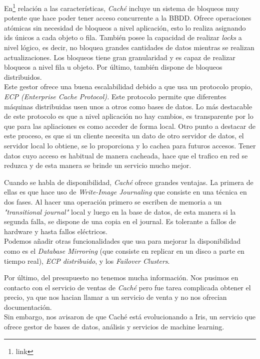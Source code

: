 \documentclass{article}
\begin{document}
En\footnote{link} relación a las características, \emph{Caché} incluye un sistema de bloqueos muy potente que hace poder tener acceso concurrente a la BBDD. Ofrece operaciones atómicas sin necesidad de bloqueos a nivel aplicación, esto lo realiza asignando ids únicos a cada objeto o fila. También posee la capacidad de realizar \emph{locks} a nivel lógico, es decir, no bloquea grandes cantidades de datos mientras se realizan actualizaciones. Los bloqueos tiene gran granularidad y es capaz de realizar bloqueos a nivel fila u objeto. Por último, también dispone de bloqueos distribuidos.\\

Este gestor ofrece una buena escalabilidad debido a que usa un protocolo propio, \emph{ECP (Enterprise Cache Protocol).} Este protocolo permite que diferentes máquinas distribuidas usen unos a otros como bases de datos. Lo más destacable de este protocolo es que a nivel aplicación no hay cambios, es transparente por lo que para las apliaciones es como acceder de forma local. Otro punto a destacar de este proceso, es que si un cliente necesita un dato de otro servidor de datos, el servidor local lo obtiene, se lo proporciona y lo cachea para futuros accesos. Tener datos cuyo acceso es habitual de manera cacheada, hace que el trafico en red se reduzca y de esta manera se brinde un servicio mucho mejor.

Cuando  se habla de disponibilidad, \emph{Caché} ofrece grandes ventajas. La primera de ellas es que hace uso de \emph{Write-Image Journaling} que consiste en una técnica en dos fases. Al hacer una operación primero se escriben de memoria a un \emph{"transitional journal"} local  y luego en la base de datos, de esta manera si la segunda falla, se dispone de una copia en el journal. Es tolerante a fallos de hardware y hasta fallos eléctricos. \\
Podemos añadir otras funcionalidades que usa para mejorar la disponibilidad como es el \emph{Database Mirroring} (que consiste en replicar en un disco a parte en tiempo real), \emph{ECP distribuido}, y los \emph{Failover Clusters}.

Por último, del presupuesto no tenemos mucha información. Nos pusimos en contacto con el servicio de ventas de \emph{Caché} pero fue tarea complicada obtener el precio, ya que nos hacian llamar a un servicio de venta y no nos ofrecian documentación.\\ Sin embargo, nos avisaron de que Caché está evolucionando a Iris, un servicio que ofrece gestor de bases de datos, análisis y servicios de machine learning.
\end{document}
